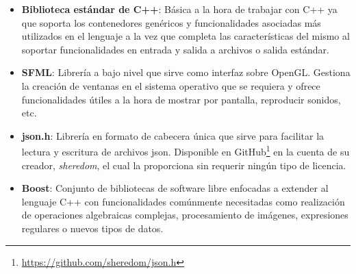 \begin{itemize}
	\item \textbf{Biblioteca estándar de C++}: Básica a la hora de trabajar con C++ ya que soporta los contenedores genéricos y funcionalidades asociadas más utilizados en el lenguaje a la vez que completa las características del mismo al soportar funcionalidades en entrada y salida a archivos o salida estándar. 
	\item \textbf{SFML}: Librería a bajo nivel que sirve como interfaz sobre OpenGL. Gestiona la creación de ventanas en el sistema operativo que se requiera y ofrece funcionalidades útiles a la hora de mostrar por pantalla, reproducir sonidos, etc.
	\item \textbf{json.h}: Librería en formato de cabecera única que sirve para facilitar la lectura y escritura de archivos json. Disponible en GitHub\footnote{\url{https://github.com/sheredom/json.h}} en la cuenta de su creador, \textit{sheredom}, el cual la proporciona sin requerir ningún tipo de licencia.
	\item \textbf{Boost}: Conjunto de bibliotecas de software libre enfocadas a extender al lenguaje C++ con funcionalidades comúnmente necesitadas como realización de operaciones algebraicas complejas, procesamiento de imágenes, expresiones regulares o nuevos tipos de datos.
\end{itemize}

